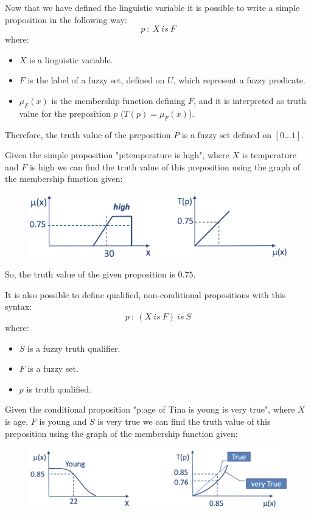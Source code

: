 \documentclass[12pt, a4paper]{report}
\theoremstyle{remark}
\begin{document}
    Now that we have defined the linguistic variable it is possible to write a simple proposition in the following way: 
    \[p\: : \: X \: is \: F\]
    where:
    \begin{itemize}
        \item $X$ is a linguistic variable.
        \item $F$ is the label of a fuzzy set, defined on $U$, which represent a fuzzy predicate.
        \item $\mu_F(x)$ is the membership function defining $F$, and it is interpreted as truth value for the preposition $p$ ($T(p)=\mu_F(x)$).
    \end{itemize}
    Therefore, the truth value of the preposition $P$ is a fuzzy set defined on $[0 \dots 1]$.
    \begin{example}
        Given the simple proposition "p:temperature is high", where $X$ is temperature and $F$ is high we can find the truth value of this 
        preposition using the graph of the membership function given:
        \begin{figure}[H]
            \centering
            \includegraphics[width=0.5\linewidth]{images/temperature.png}
        \end{figure}
        So, the truth value of the given proposition is $0.75$.
    \end{example}

    It is also possible to define qualified, non-conditional propositions with this syntax: 
    \[p \: : \: (X \: is \: F) \: is \: S\]
    where:
    \begin{itemize}
        \item $S$ is a fuzzy truth qualifier.
        \item $F$ is a fuzzy set.
        \item $p$ is truth qualified.
    \end{itemize}
    \begin{example}
        Given the conditional proposition "p:age of Tina is young is very true", where $X$ is age, $F$ is young and $S$ is very true we can 
        find the truth value of this preposition using the graph of the membership function given:
        \begin{figure}[H]
            \centering
            \includegraphics[width=0.75\linewidth]{images/age.png}
        \end{figure}
    \end{example}
\end{document}
